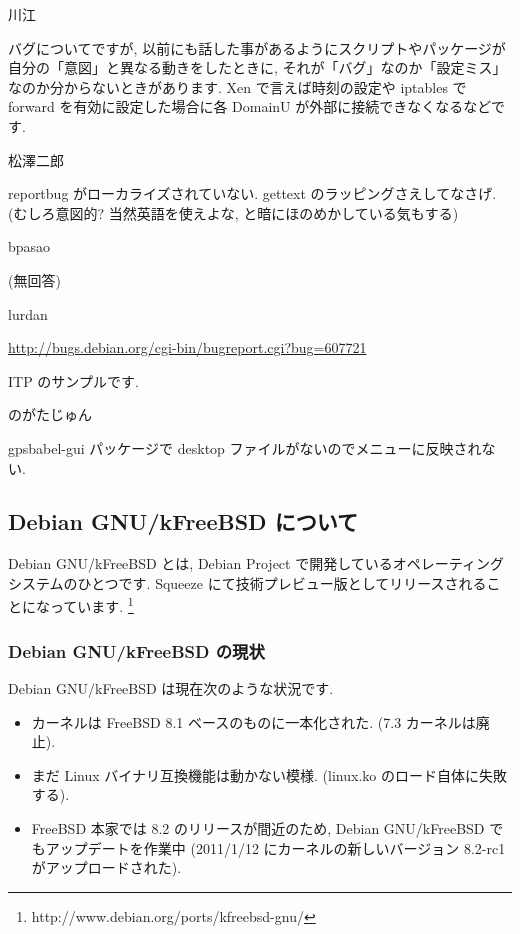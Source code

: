 \documentclass[mingoth,a4paper]{jsarticle}
\begin{document}
\begin{prework}{ 川江 }

バグについてですが, 以前にも話した事があるようにスクリプトやパッケージが自分の「意図」と異なる動きをしたときに, それが「バグ」なのか「設定ミス」なのか分からないときがあります. Xen で言えば時刻の設定や iptables で forward を有効に設定した場合に各 DomainU が外部に接続できなくなるなどです.
\end{prework}

\begin{prework}{ 松澤二郎 }

reportbug がローカライズされていない. gettext のラッピングさえしてなさげ.
(むしろ意図的? 当然英語を使えよな, と暗にほのめかしている気もする)
\end{prework}

\begin{prework}{ bpasao }

(無回答)

\end{prework}

\begin{prework}{ lurdan }

{\url{http://bugs.debian.org/cgi-bin/bugreport.cgi?bug=607721}}

ITP のサンプルです.
\end{prework}

\begin{prework}{ のがたじゅん }

gpsbabel-gui パッケージで desktop ファイルがないのでメニューに反映されない.

\end{prework}


\subsection{Debian GNU/kFreeBSD について}
Debian GNU/kFreeBSD とは, Debian Project で開発しているオペレーティングシステムのひとつです. Squeeze にて技術プレビュー版としてリリースされることになっています. \footnote{http://www.debian.org/ports/kfreebsd-gnu/}

\subsubsection{Debian GNU/kFreeBSD の現状}
Debian GNU/kFreeBSD は現在次のような状況です.

\begin{itemize}
  \item カーネルは FreeBSD 8.1 ベースのものに一本化された. (7.3 カーネルは廃止).
  \item まだ Linux バイナリ互換機能は動かない模様. (linux.ko のロード自体に失敗する).
  \item FreeBSD 本家では 8.2 のリリースが間近のため, Debian GNU/kFreeBSD でもアップデートを作業中 (2011/1/12 にカーネルの新しいバージョン 8.2-rc1 がアップロードされた).
\end{itemize}
\end{document}
